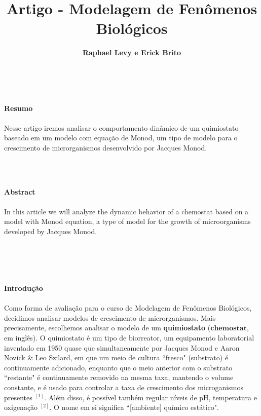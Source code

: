 \documentclass{article}
\title{\textbf{Artigo - Modelagem de Fenômenos Biológicos}}
\author{\textbf{Raphael Levy e Erick Brito}}
\date{}
\begin{document}
\maketitle
\\
\begin{center}
    \textbf{\Large{Resumo}}
    \\\\Nesse artigo iremos analisar o comportamento dinâmico de um quimiostato baseado em um modelo com equação de Monod, um tipo de modelo para o crescimento de microrganismos desenvolvido por Jacques Monod.
\end{center}
\\\\
\begin{center}
    \textbf{\Large{Abstract}}
    \\\\In this article we will analyze the dynamic behavior of a chemostat based on a model with Monod equation, a type of model for the growth of microorganisms developed by Jacques Monod. 
\end{center}
\\\\
 
\\\\
\textbf{\Large{Introdução}}
\\\\Como forma de avaliação para o curso de Modelagem de Fenômenos Biológicos, decidimos analisar modelos de crescimento de microrganismos. Mais precisamente, escolhemos analisar o modelo de um \textbf{quimiostato} ($\textbf{chemostat}$, em inglês). O quimiostato é um tipo de biorreator, um equipamento laboratorial inventado em 1950 quase que simultaneamente por Jacques Monod e Aaron Novick $\&$ Leo Szilard, em que um meio de cultura ``fresco" (substrato) é continuamente adicionado, enquanto que o meio anterior com o substrato ``restante" é continuamente removido na mesma taxa, mantendo o volume constante, e é usado para controlar a taxa de crescimento dos microganismos presentes $^{[1]}$. Além disso, é possível também regular níveis de pH, temperatura e oxigenação $^{[2]}$. O nome em si significa ``[ambiente] químico estático".
\end{document}
